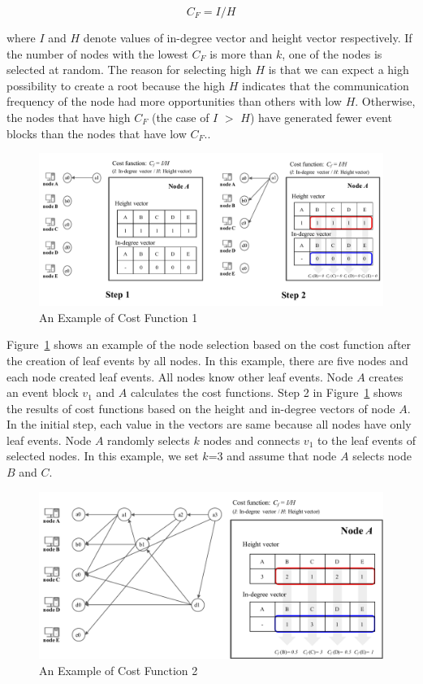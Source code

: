 \documentclass{article}
\begin{document}
\begin{equation}\label{eq1}
C_{F} =I/H
\end{equation}

where $I$ and $H$ denote values of in-degree vector and height vector respectively. If the number of nodes with the lowest $C_F$ is more than $k$, one of the nodes is selected at random. The reason for selecting high $H$ is that we can expect a high possibility to create a root because the high $H$ indicates that the communication frequency of the node had more opportunities than others with low $H$. Otherwise, the nodes that have high $C_F$ (the case of $I$ $>$ $H$) have generated fewer event blocks than the nodes that have low $C_F$.. 

\begin{figure}[H] \centering  
\includegraphics[width=.8\textwidth]{costfunction_1.pdf}
\caption{An Example of Cost Function 1}
\label{fig:costfunction_1}
\end{figure}

Figure~\ref{fig:costfunction_1} shows an example of the node selection based on the cost function after the creation of leaf events by all nodes. In this example, there are five nodes and each node created leaf events. All nodes know other leaf events. Node $A$ creates an event block $v_1$ and $A$ calculates the cost functions. Step 2 in Figure~\ref{fig:costfunction_1} shows the results of cost functions based on the height and in-degree vectors of node $A$. In the initial step, each value in the vectors are same because all nodes have only leaf events. Node $A$ randomly selects $k$ nodes and connects $v_1$ to the leaf events of selected nodes. In this example, we set $k$=3 and assume that node $A$ selects node $B$ and $C$. 

\begin{figure}[H] \centering  
\includegraphics[width=.8\textwidth]{costfunction_2.pdf}
\caption{An Example of Cost Function 2}
\label{fig:costfunction_2}
\end{figure}
\end{document}
